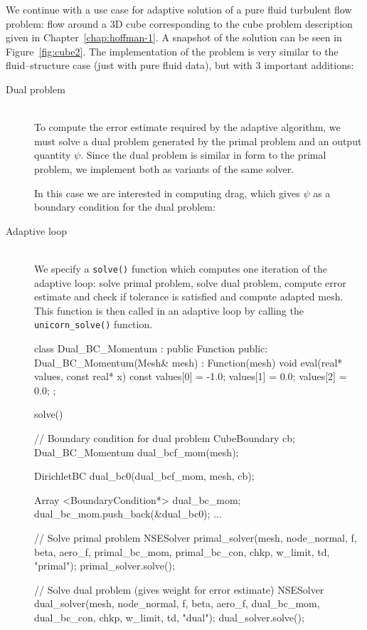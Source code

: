 We continue with a use case for adaptive solution of a pure fluid
turbulent flow problem: flow around a 3D cube corresponding to the
cube problem description given in Chapter~\ref{chap:hoffman-1}. A
snapshot of the solution can be seen in
Figure~\ref{fig:cube2}. The implementation of the problem is
very similar to the fluid--structure case (just with pure fluid data),
but with 3 important additions:
\begin{description}
\item[Dual problem] \ \\ To compute the error estimate required by the
  adaptive algorithm, we must solve a dual problem generated by the
  primal problem and an output quantity $\psi$. Since the dual problem
  is similar in form to the primal problem, we implement both as
  variants of the same solver.

In this case we are interested in computing drag, which gives $\psi$
as a boundary condition for the dual problem:

\item[Adaptive loop] \ \\ We specify a {\tt solve()} function which computes one
  iteration of the adaptive loop: solve primal problem, solve dual
  problem, compute error estimate and check if tolerance is satisfied
  and compute adapted mesh. This function is then called in an
  adaptive loop by calling the {\tt unicorn\_solve()} function.

\begin{c++}
class Dual_BC_Momentum : public Function
{
public:
  Dual_BC_Momentum(Mesh& mesh) : Function(mesh) {}
  void eval(real* values, const real* x) const
  {
    values[0] = -1.0;
    values[1] = 0.0;
    values[2] = 0.0;
  }
};

solve()
{
  // Boundary condition for dual problem
  CubeBoundary cb;
  Dual_BC_Momentum dual_bcf_mom(mesh);

  DirichletBC dual_bc0(dual_bcf_mom, mesh, cb);

  Array <BoundaryCondition*> dual_bc_mom;
  dual_bc_mom.push_back(&dual_bc0);
  ...


  // Solve primal problem
  NSESolver primal_solver(mesh, node_normal, f, beta, aero_f, primal_bc_mom, primal_bc_con,
    chkp, w_limit, td, "primal");
  primal_solver.solve();

  // Solve dual problem (gives weight for error estimate)
  NSESolver dual_solver(mesh, node_normal, f, beta, aero_f, dual_bc_mom, dual_bc_con,
    chkp, w_limit, td, "dual");
  dual_solver.solve();
}


\end{c++}
\end{description}

